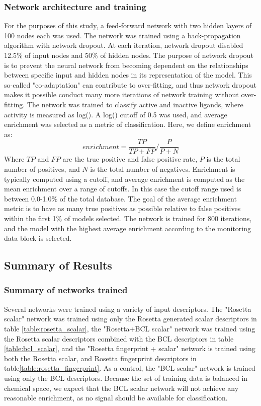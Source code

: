 \subsubsection{Network architecture and training}

For the purposes of this study, a feed-forward network with two hidden layers of 100 nodes each was used.
The network was trained using a back-propagation algorithm with network dropout\citep{Hinton:2012tv}.
At each iteration, network dropout disabled 12.5\% of input nodes and 50\% of hidden nodes.
The purpose of network dropout is to prevent the neural network from becoming dependent on the relationships between specific input and hidden nodes in its representation of the model.
This so-called "co-adaptation" can contribute to over-fitting, and thus network dropout makes it possible conduct many more iterations of network training without over-fitting.
The network was trained to classify active and inactive ligands, where activity is measured as log(\ki).
A log(\ki) cutoff of 0.5 was used, and average enrichment was selected as a metric of classification.
Here, we define enrichment as:
\begin{equation}
\label{eq:enrichment}
enrichment = \frac{TP}{TP+FP}/\frac{P}{P+N}
\end{equation}
Where $TP$ and $FP$ are the true positive and false positive rate, $P$ is the total number of positives, and $N$ is the total number of negatives.
Enrichment is typically computed using a cutoff, and average enrichment is computed as the mean enrichment over a range of cutoffs.  In this case the cutoff range used is between 0.0-1.0\% of the total database.
The goal of the average enrichment metric is to have as many true positives as possible relative to false positives within the first 1\% of models selected.
The network is trained for 800 iterations, and the model with the highest average enrichment according to the monitoring data block is selected.

\subsection{Summary of Results}

\subsubsection{Summary of networks trained}
\label{subsubsec:network_training}
Several networks were trained using a variety of input descriptors.
The "Rosetta scalar" network was trained using only the Rosetta generated scalar descriptors in table \ref{table:rosetta_scalar}, the "Rosetta+BCL scalar" network was trained using the Rosetta scalar descriptors combined with the BCL descriptors in table \ref{table:bcl_scalar}, and the "Rosetta fingerprint + scalar" network is trained using both the Rosetta scalar, and Rosetta fingerprint descriptors in table\ref{table:rosetta_fingerprint}.
As a control, the "BCL scalar" network is trained using only the BCL descriptors.
Because the set of training data is balanced in chemical space, we expect that the BCL scalar network will not achieve any reasonable enrichment, as no signal should be available for classification.

